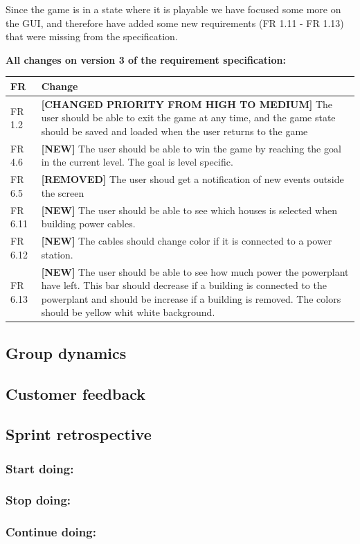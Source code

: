 	Since the game is in a state where it is playable we have focused some more on the 
	GUI, and therefore have added some new requirements (FR 1.11 - FR 1.13) that were missing 
	from the specification.
	
	{\bf All changes on version 3 of the requirement specification:} \\
	\begin{tabular}{| p{1.5cm} | p{12cm} |}
		\hline
		\rowcolor{lightgray}
		{\bf FR} & {\bf Change} \\ \hline
		FR 1.2 & {\bf \color{orange}[CHANGED PRIORITY FROM HIGH TO MEDIUM]} The user should be able 
		to exit the game at any time, and the game state should be saved and loaded when the user 
		returns to the game \\ \hline
		FR 4.6 & {\bf \color{green}[NEW]} The user should be able to win the game by reaching the goal in the current level. The goal is level specific. \\ \hline
		FR 6.5 & {\bf \color{red}[REMOVED]} The user shoud get a notification of new events outside 
		the screen \\ \hline
		FR 6.11 & {\bf \color{green}[NEW]} The user should be able to see which houses is selected when building power cables. \\ \hline
		FR 6.12 & {\bf \color{green}[NEW]} The cables should change color if it is connected to a power 
		station. \\ \hline
		FR 6.13 & {\bf \color{green}[NEW]} The user should be able to see how much power the 
		powerplant have left. This bar should decrease if a building is connected to the powerplant 
		and should be increase if a building is removed. The colors should be yellow whit white 
		background. \\ \hline
	\end{tabular}


\subsection{Group dynamics}

\subsection{Customer feedback}

\subsection{Sprint retrospective}
	\subsubsection*{Start doing: } 
	\subsubsection*{Stop doing: }
	\subsubsection*{Continue doing: }